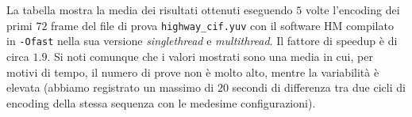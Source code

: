 La tabella mostra la media dei risultati ottenuti eseguendo $5$ volte 
l'encoding dei primi $72$ frame del file di prova \verb|highway_cif.yuv| con il 
software HM compilato in \verb|-Ofast| nella sua versione \emph{singlethread} e 
\emph{multithread}. Il fattore di speedup è di circa $1.9$. Si noti comunque 
che i valori mostrati sono una media in cui, per motivi di tempo, il numero di 
prove non è molto alto, mentre la variabilità è elevata (abbiamo registrato un 
massimo di $20$ secondi di differenza tra due cicli di encoding della stessa 
sequenza con le medesime configurazioni).
